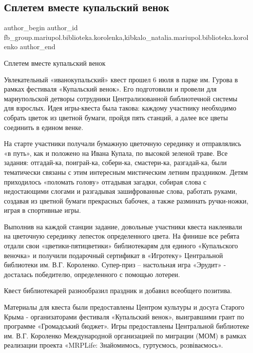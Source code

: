  
 
 
 
 

\subsection{Сплетем вместе купальский венок}
\label{sec:07_07_2018.fb.fb_group.mariupol.biblioteka.korolenka.1.spletem_vmeste_kupal}
 
\ifcmt
 author_begin
   author_id fb_group.mariupol.biblioteka.korolenka,kibkalo_natalia.mariupol.biblioteka.korolenko
 author_end
\fi

Сплетем вместе купальский венок

Увлекательный «иванокупальский» квест прошел 6 июля в парке им. Гурова в рамках
фестиваля «Купальский венок».  Его подготовили и провели для мариупольской
детворы сотрудники Централизованной библиотечной системы для взрослых. Идея
игры-квеста была такова: каждому участнику необходимо собрать цветок из цветной
бумаги, пройдя пять станций, а далее все цветы  соединить в едином венке.

На старте участники получали бумажную цветочную серединку и отправлялись «в
путь», как и положено на Ивана Купала, по высокой зеленой траве.  Все задания:
отгадай-ка, поиграй-ка, собери-ка, смастери-ка, разгадай-ка, были тематически
связаны с этим интересным мистическим летним праздником. Детям приходилось
«поломать голову» отгадывая загадки, собирая слова с недостающими слогами и
разгадывая зашифрованные  слова,  работать руками, создавая из цветной бумаги
прекрасных бабочек, а также разминать ручки-ножки, играя в спортивные игры. 

Выполнив на каждой станции задание, довольные  участники квеста наклеивали на
цветочную серединку лепесток определенного цвета. На финише все ребята отдали
свои «цветики-пятицветики» библиотекарям для единого «Купальского веночка» и
получили подарочный сертификат в «Игротеку» Центральной библиотеки им. В.Г.
Короленко.  Супер-приз – настольная игра «Эрудит» - досталась победителю,
определенного с помощью лотереи.  

Квест библиотекарей разнообразил праздник и добавил всеобщего позитива.

Материалы для квеста были предоставлены Центром культуры и досуга Старого Крыма
- организаторами фестиваля «Купальский венок», выигравшими грант по программе
«Громадський бюджет».  Игры предоставлены Центральной библиотеке им. В.Г.
Короленко Международной организацией по миграции (МОМ) в рамках реализации
проекта «MRPLife: Знайомимось, гуртуємось, розвіваємось».

